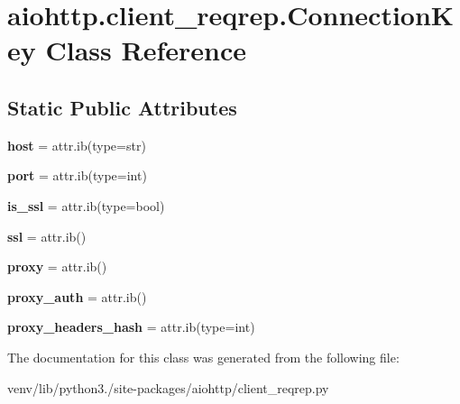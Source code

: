 \hypertarget{classaiohttp_1_1client__reqrep_1_1_connection_key}{}\section{aiohttp.\+client\+\_\+reqrep.\+Connection\+Key Class Reference}
\label{classaiohttp_1_1client__reqrep_1_1_connection_key}
\subsection*{Static Public Attributes}
\begin{DoxyCompactItemize}
\item 
\mbox{\label{classaiohttp_1_1client__reqrep_1_1_connection_key_a57a751d09fb89f00e8a7a8adf661b559}} 
{\bfseries host} = attr.\+ib(type=str)
\item 
\mbox{\label{classaiohttp_1_1client__reqrep_1_1_connection_key_abf9695ba843a1d8fb84044b6918b4503}} 
{\bfseries port} = attr.\+ib(type=int)
\item 
\mbox{\label{classaiohttp_1_1client__reqrep_1_1_connection_key_aa1e25411a96db3ef62e6cc02991ac6d5}} 
{\bfseries is\+\_\+ssl} = attr.\+ib(type=bool)
\item 
\mbox{\label{classaiohttp_1_1client__reqrep_1_1_connection_key_ae06383a1232ebd174d9f10095d6e78be}} 
{\bfseries ssl} = attr.\+ib()
\item 
\mbox{\label{classaiohttp_1_1client__reqrep_1_1_connection_key_a9f14d329a1d88c1efa41c69f4b4ab119}} 
{\bfseries proxy} = attr.\+ib()
\item 
\mbox{\label{classaiohttp_1_1client__reqrep_1_1_connection_key_a0e924eec9bd862d15325ae8412a219ba}} 
{\bfseries proxy\+\_\+auth} = attr.\+ib()
\item 
\mbox{\label{classaiohttp_1_1client__reqrep_1_1_connection_key_aa70e8e38f3bbdeeabb82f337070a947c}} 
{\bfseries proxy\+\_\+headers\+\_\+hash} = attr.\+ib(type=int)
\end{DoxyCompactItemize}


The documentation for this class was generated from the following file\+:\begin{DoxyCompactItemize}
\item 
venv/lib/python3./site-\/packages/aiohttp/client\+\_\+reqrep.\+py\end{DoxyCompactItemize}
